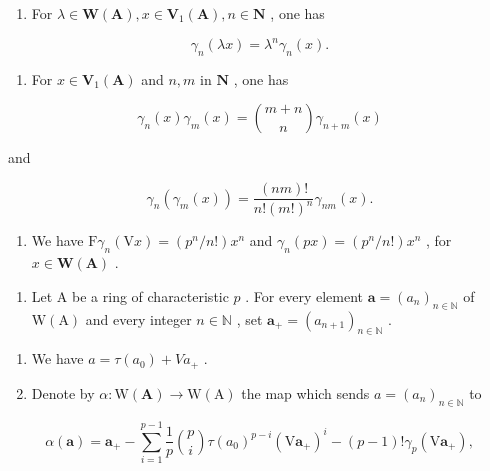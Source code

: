 \begin{enumerate}
\def\labelenumi{(\roman{enumi})}
\setcounter{enumi}{2}
\tightlist
\item
  For \(\lambda \in \mathbf{W}(\mathbf{A}), x \in \mathbf{V}_1(\mathbf{A}), n \in \mathbf{N}\) , one has
\end{enumerate}

\[
\gamma_ {n} (\lambda x) = \lambda^ {n} \gamma_ {n} (x).
\]

\begin{enumerate}
\def\labelenumi{(\roman{enumi})}
\setcounter{enumi}{3}
\tightlist
\item
  For \(x \in \mathbf{V}_1(\mathbf{A})\) and \(n, m\) in \(\mathbf{N}\) , one has
\end{enumerate}

\[
\gamma_ {n} (x) \gamma_ {m} (x) = \binom {m + n} {n} \gamma_ {n + m} (x)
\]

and

\[
\gamma_ {n} (\gamma_ {m} (x)) = \frac {(n m) !}{n ! (m !) ^ {n}} \gamma_ {n m} (x).
\]

\begin{enumerate}
\def\labelenumi{(\alph{enumi})}
\setcounter{enumi}{21}
\tightlist
\item
  We have \(\mathrm{F}\gamma_{n}(\mathrm{V}x) = (p^{n}/n!)x^{n}\) and \(\gamma_{n}(px) = (p^{n}/n!)x^{n}\) , for \(x \in \mathbf{W}(\mathbf{A})\) .
\end{enumerate}

\begin{enumerate}
\def\labelenumi{\arabic{enumi})}
\setcounter{enumi}{11}
\tightlist
\item
  Let A be a ring of characteristic \(p\) . For every element \(\boldsymbol{a} = (a_n)_{n \in \mathbb{N}}\) of \(\mathrm{W(A)}\) and every integer \(n \in \mathbb{N}\) , set \(\boldsymbol{a}_+ = (a_{n+1})_{n \in \mathbb{N}}\) .
\end{enumerate}

\begin{enumerate}
\def\labelenumi{\alph{enumi})}
\item
  We have \(a = \tau(a_{0}) + V a_{+}\) .
\item
  Denote by \(\alpha : \mathrm{W}(\mathbf{A}) \to \mathrm{W}(\mathrm{A})\) the map which sends \(a = (a_n)_{n \in \mathbb{N}}\) to
\end{enumerate}

\[
\alpha (\boldsymbol {a}) = \boldsymbol {a} _ {+} - \sum_ {i = 1} ^ {p - 1} \frac {1}{p} \binom {p} {i} \tau (a _ {0}) ^ {p - i} (\mathrm{V} \boldsymbol {a} _ {+}) ^ {i} - (p - 1)! \gamma_ {p} (\mathrm{V} \boldsymbol {a} _ {+}),
\]


